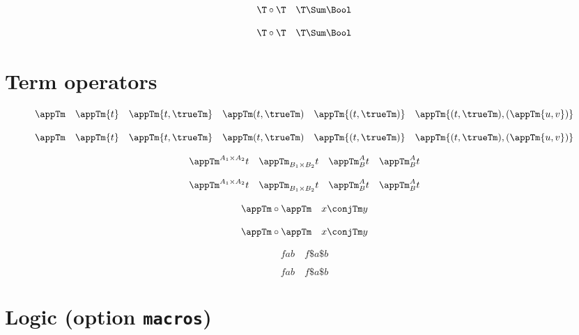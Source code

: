\documentclass{article}
\def\termfont{\mathbf}
\begin{document}
\begin{verbatim*}
\[
\T \circ \T\quad
\T \Sum \Bool
\]
\end{verbatim*}
%
\[
  \T \circ \T\quad
  \T \Sum \Bool
\]

\section{Term operators}

\begin{verbatim*}
\def\termfont{\mathbf}

\DeclareTermInfix{\conjTm}{\wedge}
\end{verbatim*}

\begin{verbatim*}
\[
\appTm\quad
\appTm{t}\quad
\appTm{t,\trueTm}\quad
\appTm(t,\trueTm)\quad
\appTm{(t,\trueTm)}\quad
\appTm{(t,\trueTm),(\appTm{u,v})}
\]
\end{verbatim*}
%
\[
  \appTm              \quad
  \appTm{t}           \quad
  \appTm{t,\trueTm}   \quad
  \appTm(t,\trueTm)   \quad
  \appTm{(t,\trueTm)} \quad
  \appTm{(t,\trueTm),(\appTm{u,v})}
\]

\begin{verbatim*}
\[
\appTm^{A_1\times A_2}{t}\quad
\appTm_{B_1\times B_2}{t}\quad
\appTm^A_B{t}\quad
\appTm_B^A{t}
\]
\end{verbatim*}
%
\[
  \appTm^{A_1 \times A_2}{t} \quad
  \appTm_{B_1 \times B_2}{t} \quad
  \appTm^A_B{t}              \quad
  \appTm_B^A{t}
\]

\begin{verbatim*}
\[
\appTm\circ\appTm\quad
x\conjTm y
\]
\end{verbatim*}
%
\[
  \appTm \circ \appTm \quad
  x \conjTm y
\]

\begin{verbatim*}
\[
f a b\quad
f\$a\$b
\]
\end{verbatim*}
%
\[
  f a b \quad
  f\$a\$b
\]

\section{Logic (option \texttt{macros})}
\end{document}

